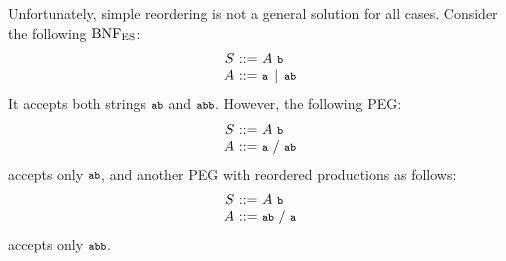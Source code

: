 Unfortunately, simple reordering is not a general solution for all
cases.  Consider the following \( \text{BNF}_{\text{ES}} \):
\begin{equation}
  \begin{array}{r@{~}c@{~}l}
    \NT{S} &::=& \NT{A} ~ \T{b}\\
    \NT{A} &::=& \T{a} \,\mid\, \T{a} \T{b}\\
  \end{array}
\end{equation}
It accepts both strings \( \texttt{\footnotesize ab} \) and \( \texttt{\footnotesize abb} \).
However, the following PEG:
\begin{equation}
  \begin{array}{r@{~}c@{~}l}
    \NT{S} &::=& \NT{A} ~ \T{b}\\
    \NT{A} &::=& \T{a} ~/~ \T{a} \T{b}\\
  \end{array}
\end{equation}
accepts only \( \texttt{\footnotesize ab} \), and another PEG with reordered
productions as follows:
\begin{equation}
  \begin{array}{r@{~}c@{~}l}
    \NT{S} &::=& \NT{A} ~ \T{b}\\
    \NT{A} &::=& \T{a} \T{b} ~/~ \T{a}\\
  \end{array}
\end{equation}
accepts only \( \texttt{\footnotesize abb} \).

